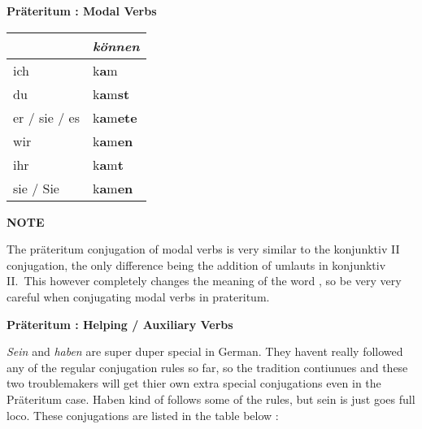 \documentclass[a4paper,twocolumn,10pt]{article}
\newcommand{\newpar}
{\par \vspace{0.3cm}}
\newcommand{\tcolorboxstart}
{
	\nolinenumbers
	\vspace{0.2cm}
	\centering
}
\newcommand{\tcolorboxend}
{
	\justifying
	\vspace{0.2cm}
	\linenumbers
}
\newcommand{\tcolorboxnote}[1]
{

\tcolorboxstart
\begin{note-bg}

	\begin{note-theword}
		{\footnotesize \textbf{NOTE} }
	\end{note-theword}

	\begin{note-content} \justifying

		#1

	\end{note-content}

\end{note-bg}
\tcolorboxend
}
\newcommand{\tabularxtable}[3]
{

	\vspace{0.5cm}
	\nolinenumbers

	\begin{tabularx}{#1}{#2}
		#3
	\end{tabularx}

	\linenumbers
	\vspace{0.5cm}
}
\begin{document}
\textbf{Präteritum : Modal Verbs}\cite{em}
\tabularxtable
{0.95\linewidth}
{l|X}
{

	&
	\textit{können} \\
	\midrule

	\cellcolor{table-subtopic} ich &
	k\textcolor{red-flame}{\textbf{a}}m \\

	\cellcolor{table-subtopic} du &
	\cellcolor{table-alternating-blue} k\textcolor{red-flame}{\textbf{a}}m\textcolor{green-goethe}{\textbf{st}}\\

	\cellcolor{table-subtopic} er / sie / es &
	k\textcolor{red-flame}{\textbf{a}}m\textcolor{green-goethe}{\textbf{ete}} \\

	\cellcolor{table-subtopic} wir &
	\cellcolor{table-alternating-blue}
	k\textcolor{red-flame}{\textbf{a}}m\textcolor{green-goethe}{\textbf{en}} \\

	\cellcolor{table-subtopic} ihr &
	k\textcolor{red-flame}{\textbf{a}}m\textcolor{green-goethe}{\textbf{t}} \\

	\cellcolor{table-subtopic} sie / Sie &
	\cellcolor{table-alternating-blue}
	k\textcolor{red-flame}{\textbf{a}}m\textcolor{green-goethe}{\textbf{en}} \\



}



\tcolorboxnote
{

The präteritum conjugation of modal verbs is very similar to the konjunktiv II
conjugation, the only difference being the addition of umlauts in konjunktiv
II.\ This however completely changes the meaning of the word , so be very very
careful when conjugating modal verbs in prateritum.

}










\textbf{Präteritum : Helping / Auxiliary Verbs}\cite{em}

\textit{Sein} and \textit{haben} are super duper special in German. They havent
really followed any of the regular conjugation rules so far, so the tradition
contiunues and these two troublemakers will get thier own extra special
conjugations even in the Präteritum case. Haben kind of follows some of the
rules, but sein is just goes full loco. These conjugations are listed in the table
below :\newpar
\end{document}
